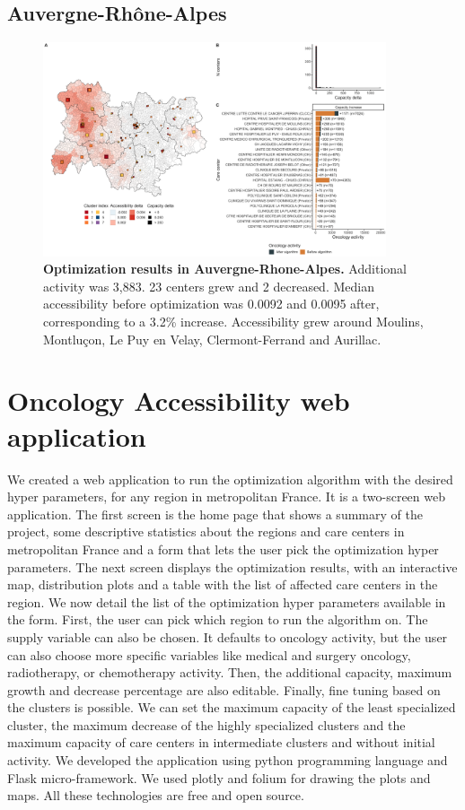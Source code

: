 \subsection*{Auvergne-Rhône-Alpes}

\begin{figure}[H]
    \includegraphics[width=0.9\textwidth]{images/camion/optim_region/optim_Auvergne-Rhone-Alpes.png}
    \centering
    \caption{ \textbf{Optimization results in Auvergne-Rhone-Alpes.} Additional
        activity was 3,883. 23 centers grew and 2 decreased. Median
        accessibility before optimization was 0.0092 and 0.0095 after,
        corresponding to a 3.2\% increase. Accessibility grew around Moulins,
        Montluçon, Le Puy en Velay, Clermont-Ferrand and Aurillac. }
\end{figure}

\section{Oncology Accessibility web application}

We created a web application to run the optimization algorithm with the desired
hyper parameters, for any region in metropolitan France. It is a two-screen web
application. The first screen is the home page that shows a summary of the
project, some descriptive statistics about the regions and care centers in
metropolitan France and a form that lets the user pick the optimization hyper
parameters. The next screen displays the optimization results, with an
interactive map, distribution plots and a table with the list of affected care
centers in the region. We now detail the list of the optimization hyper
parameters available in the form. First, the user can pick which region to run
the algorithm on. The supply variable can also be chosen. It defaults to
oncology activity, but the user can also choose more specific variables like
medical and surgery oncology, radiotherapy, or chemotherapy activity. Then, the
additional capacity, maximum growth and decrease percentage are also editable.
Finally, fine tuning based on the clusters is possible. We can set the maximum
capacity of the least specialized cluster, the maximum decrease of the highly
specialized clusters and the maximum capacity of care centers in intermediate
clusters and without initial activity. We developed the application using python
programming language and Flask micro-framework. We used plotly and folium for
drawing the plots and maps. All these technologies are free and open source.


